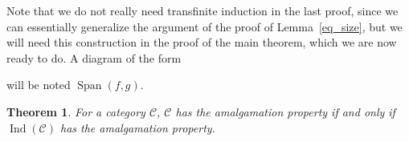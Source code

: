 \documentclass{article}
\newtheorem{theorem}{Theorem}
\newcommand{\Ind}{\operatorname{Ind}}
\newcommand{\Span}{\operatorname{Span}}
\begin{document}
Note that we do not really need transfinite induction in the last proof, since we can essentially generalize the argument of the proof of Lemma~\ref{eq_size}, but we will need this construction in the proof of the main theorem, which we are now ready to do. A diagram of the form
\begin{center}
\end{center}
will be noted $\Span(f,g)$.
\begin{theorem}
    For a category $\mathcal{C}$, $\mathcal{C}$ has the amalgamation property if and only if $\Ind(\mathcal{C})$ has the amalgamation property.
\end{theorem}
\end{document}
